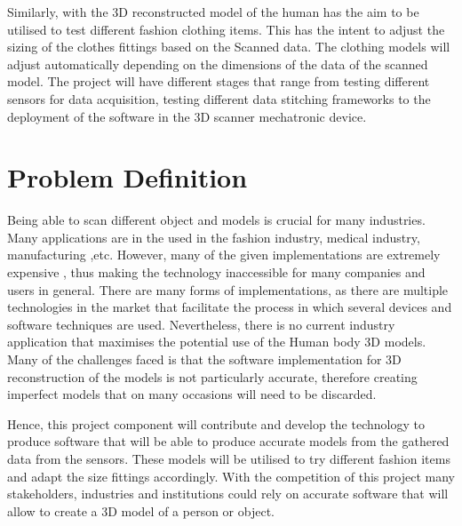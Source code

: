 \documentclass[12pt]{report}
\begin{document}
Similarly, with the 3D reconstructed model of the human has the aim to be utilised to test different fashion clothing items. This has the intent to adjust the sizing of the clothes fittings based on the Scanned data. The clothing models will adjust automatically depending on the dimensions of the data of the scanned model. 
The project will have different stages that range from testing different sensors for data acquisition, testing different data stitching frameworks to the deployment of the software in the 3D scanner mechatronic device.

\section{Problem Definition}
Being able to scan different object and models is crucial for many industries. Many applications are in the used in the fashion industry, medical industry, manufacturing ,etc. However, many of the given implementations are extremely expensive , thus making the technology inaccessible for many companies and users in general. 
There are many forms of implementations, as there are multiple technologies in the market that facilitate the process in which several devices and software techniques are used. Nevertheless, there is no current industry application that maximises the potential use of the Human body 3D models.
Many of the challenges faced is that the software implementation for 3D reconstruction of the models is not particularly accurate, therefore creating imperfect models that on many occasions will need to be discarded.

Hence, this project component will contribute and develop the technology to produce software that will be able to produce accurate models from the gathered data from the sensors. These models will be utilised to try different fashion items and adapt the size fittings accordingly. 
With the competition of this project many stakeholders, industries and institutions could rely on accurate software that will  allow to create a 3D model of a person or object.


\enlargethispage{\baselineskip}
\end{document}
